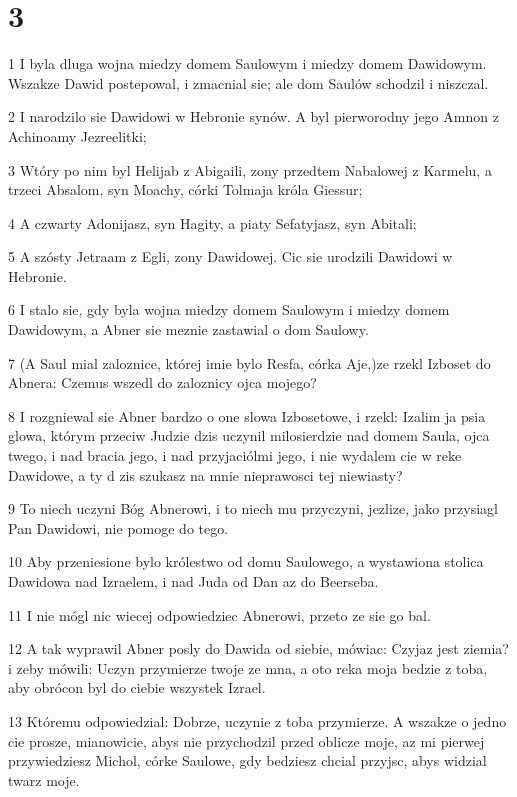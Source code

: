 \chapter{3}

\par 1 I byla dluga wojna miedzy domem Saulowym i miedzy domem Dawidowym. Wszakze Dawid postepowal, i zmacnial sie; ale dom Saulów schodzil i niszczal.
\par 2 I narodzilo sie Dawidowi w Hebronie synów. A byl pierworodny jego Amnon z Achinoamy Jezreelitki;
\par 3 Wtóry po nim byl Helijab z Abigaili, zony przedtem Nabalowej z Karmelu, a trzeci Absalom, syn Moachy, córki Tolmaja króla Giessur;
\par 4 A czwarty Adonijasz, syn Hagity, a piaty Sefatyjasz, syn Abitali;
\par 5 A szósty Jetraam z Egli, zony Dawidowej. Cic sie urodzili Dawidowi w Hebronie.
\par 6 I stalo sie, gdy byla wojna miedzy domem Saulowym i miedzy domem Dawidowym, a Abner sie meznie zastawial o dom Saulowy.
\par 7 (A Saul mial zaloznice, której imie bylo Resfa, córka Aje,)ze rzekl Izboset do Abnera: Czemus wszedl do zaloznicy ojca mojego?
\par 8 I rozgniewal sie Abner bardzo o one slowa Izbosetowe, i rzekl: Izalim ja psia glowa, którym przeciw Judzie dzis uczynil milosierdzie nad domem Saula, ojca twego, i nad bracia jego, i nad przyjaciólmi jego, i nie wydalem cie w reke Dawidowe, a ty d zis szukasz na mnie nieprawosci tej niewiasty?
\par 9 To niech uczyni Bóg Abnerowi, i to niech mu przyczyni, jezlize, jako przysiagl Pan Dawidowi, nie pomoge do tego.
\par 10 Aby przeniesione bylo królestwo od domu Saulowego, a wystawiona stolica Dawidowa nad Izraelem, i nad Juda od Dan az do Beerseba.
\par 11 I nie mógl nic wiecej odpowiedziec Abnerowi, przeto ze sie go bal.
\par 12 A tak wyprawil Abner posly do Dawida od siebie, mówiac: Czyjaz jest ziemia? i zeby mówili: Uczyn przymierze twoje ze mna, a oto reka moja bedzie z toba, aby obrócon byl do ciebie wszystek Izrael.
\par 13 Któremu odpowiedzial: Dobrze, uczynie z toba przymierze. A wszakze o jedno cie prosze, mianowicie, abys nie przychodzil przed oblicze moje, az mi pierwej przywiedziesz Michol, córke Saulowe, gdy bedziesz chcial przyjsc, abys widzial twarz moje.
